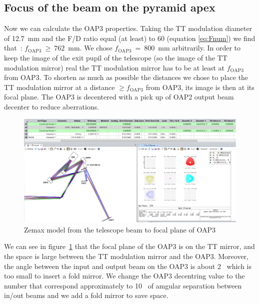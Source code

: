 \documentclass[12pt,a4paper]{article}
\begin{document}
\subsection{Focus of the beam on the pyramid apex}
Now we can calculate the OAP3 properties. Taking the TT modulation diameter of 12.7~mm and the F/D ratio equal (at least) to 60 (equation \eqref{eq:Fnum}) we find that~: $f_\text{OAP3}~\geq~762$~mm. We chose $f_\text{OAP3}~=~800$~mm arbitrarily. In order to keep the image of the exit pupil of the telescope (so the image of the TT modulation mirror) real the TT modulation mirror has to be at least at $f_\text{OAP3}$ from OAP3. To shorten as much as possible the distances we chose to place the TT modulation mirror at a distance $\geq f_\text{OAP3}$ from OAP3, its image is then at its focal plane. The OAP3 is decentered with a pick up of OAP2 output beam decenter to reduce aberrations.
\begin{figure}[H]
	\begin{center}
		\includegraphics[width=\textwidth]{images/Zemax_model_FP_OAP3_2nd_approach.PNG}
		\caption{Zemax model from the telescope beam to focal plane of OAP3}\label{fig:Zemax_model_FP_OAP3_2nd_approach}
	\end{center}
\end{figure}
We can see in figure~\ref{fig:Zemax_model_FP_OAP3_2nd_approach} that the focal plane of the OAP3 is on the TT mirror, and the space is large between the TT modulation mirror and the OAP3. Moreover, the angle between the input and output beam on the OAP3 is about 2\degree~ which is too small to insert a fold mirror. We change the OAP3 decentring value to the number that correspond approximately to 10\degree~ of amgular separation between in/out beams and we add a fold mirror to save space.
\end{document}
